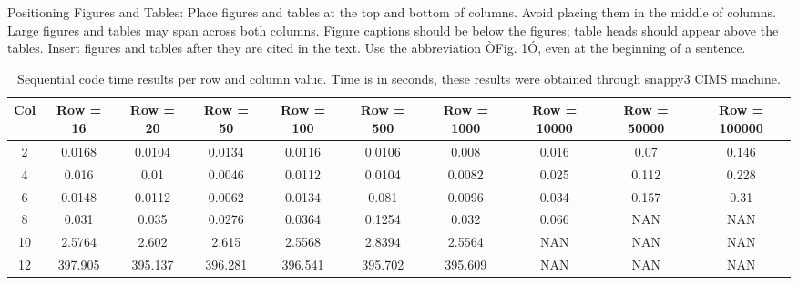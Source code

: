 \documentclass[letterpaper, 10 pt, conference]{ieeeconf}  %
\begin{document}


Positioning Figures and Tables: Place figures and tables at the top and bottom of columns. Avoid placing them in the middle of columns. Large figures and tables may span across both columns. Figure captions should be below the figures; table heads should appear above the tables. Insert figures and tables after they are cited in the text. Use the abbreviation ÒFig. 1Ó, even at the beginning of a sentence.

\begin{table}[h]
\centering
\caption{Sequential code time results per row and column value. Time is in seconds, these results were obtained through snappy3 CIMS machine.}
\label{seq_ex}
\begin{center}
\begin{tabular}{|c|c|c|c|c|c|c|c|c|c|}
\hline
Col & Row = 16 & Row = 20 & Row = 50 & Row = 100 & Row = 500 & Row = 1000 & Row = 10000 & Row = 50000 & Row = 100000\\
\hline
2 & 0.0168 & 0.0104 & 0.0134 & 0.0116 & 0.0106 & 0.008 & 0.016 & 0.07 & 0.146 \\
\hline
4 & 0.016 & 0.01 & 0.0046 & 0.0112 & 0.0104 & 0.0082 & 0.025 & 0.112 & 0.228 \\
\hline
6 & 0.0148 & 0.0112 & 0.0062 & 0.0134 & 0.081 & 0.0096 & 0.034 & 0.157 & 0.31 \\
\hline
8 & 0.031 & 0.035 & 0.0276 & 0.0364 & 0.1254 & 0.032 & 0.066 & NAN & NAN \\
\hline
10 & 2.5764 & 2.602 & 2.615 & 2.5568 & 2.8394 & 2.5564 & NAN & NAN & NAN \\
\hline
12 & 397.905 & 395.137 & 396.281 & 396.541 & 395.702 & 395.609 & NAN & NAN & NAN \\
\hline
\end{tabular}
\end{center}
\end{table}
\end{document}
